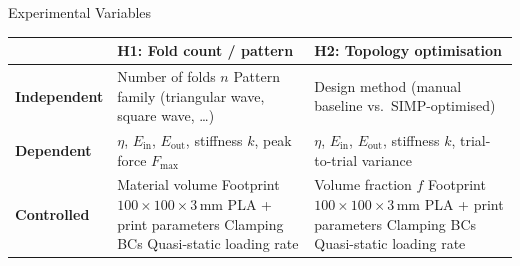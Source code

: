\begin{frame}{Experimental Variables}
  \footnotesize
  \begin{tabularx}{\textwidth}{@{}p{2.0cm}>{\raggedright\arraybackslash}X>{\raggedright\arraybackslash}X@{}}
    \toprule
     & \textbf{H1: Fold count / pattern}
     & \textbf{H2: Topology optimisation} \\
    \midrule
    \textbf{Independent}
      & Number of folds $n$\newline
        Pattern family\newline
        (triangular wave, square wave, \ldots)
      & Design method (manual baseline vs.\ SIMP-optimised) \\
    \addlinespace
    \textbf{Dependent}
      & $\eta$, $E_{\text{in}}$, $E_{\text{out}}$, stiffness $k$,
        peak force $F_{\max}$
      & $\eta$, $E_{\text{in}}$, $E_{\text{out}}$, stiffness $k$,
        trial-to-trial variance \\
    \addlinespace
    \textbf{Controlled}
      & Material volume\newline
        Footprint $100{\times}100{\times}3$\,mm\newline
        PLA + print parameters\newline
        Clamping BCs\newline
        Quasi-static loading rate
      & Volume fraction $f$\newline
        Footprint $100{\times}100{\times}3$\,mm\newline
        PLA + print parameters\newline
        Clamping BCs\newline
        Quasi-static loading rate \\
    \bottomrule
  \end{tabularx}
\end{frame}


